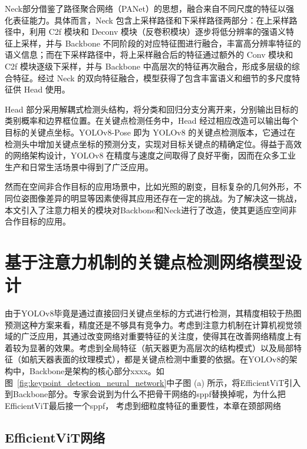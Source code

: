 Neck部分借鉴了路径聚合网络（PANet）的思想，融合来自不同尺度的特征以强化表征能力。具体而言，Neck 包含上采样路径和下采样路径两部分：在上采样路径中，利用 C2f 模块和 Deconv 模块（反卷积模块）逐步将低分辨率的强语义特征上采样，并与 Backbone 不同阶段的对应特征图进行融合，丰富高分辨率特征的语义信息；而在下采样路径中，将上采样融合后的特征通过额外的 Conv 模块和 C2f 模块逐级下采样，并与 Backbone 中高层次的特征再次融合，形成多层级的综合特征。经过 Neck 的双向特征融合，模型获得了包含丰富语义和细节的多尺度特征供 Head 使用。 

Head 部分采用解耦式检测头结构，将分类和回归分支分离开来，分别输出目标的类别概率和边界框位置。在关键点检测任务中，Head 经过相应改造可以输出每个目标的关键点坐标。YOLOv8-Pose 即为 YOLOv8 的关键点检测版本，它通过在检测头中增加关键点坐标的预测分支，实现对目标关键点的精确定位。得益于高效的网络架构设计，YOLOv8 在精度与速度之间取得了良好平衡，因而在众多工业生产和日常生活场景中得到了广泛应用\cite{sohan2024review,s23167190,ani14121791,Dong2024,yuan2024yolov8}。

然而在空间非合作目标的应用场景中，比如光照的剧变，目标复杂的几何外形，不同位姿图像差异的明显等因素使得其应用还存在一定的挑战。为了解决这一挑战，本文引入了注意力相关的模块对Backbone和Neck进行了改造，使其更适应空间非合作目标的应用。


\section{基于注意力机制的关键点检测网络模型设计}
由于YOLOv8毕竟是通过直接回归关键点坐标的方式进行检测，其精度相较于热图预测这种方案来看，精度还是不够具有竞争力。考虑到注意力机制在计算机视觉领域的广泛应用，其通过改变网络对重要特征的关注度，使得其在改善网络精度上有着较为显著的效果。考虑到全局特征（航天器更为高层次的结构模式）以及局部特征（如航天器表面的纹理模式），都是关键点检测中重要的依据。在YOLOv8的架构中，Backbone是架构的核心部分xxxx。如图~\ref{fig:keypoint_detection_neural_network}中子图 (a) 所示，将EfficientViT引入到Backbone部分。{专家会说到为什么不把骨干网络的sppf替换掉呢，为什么把EfficientViT最后接一个sppf}， 考虑到细粒度特征的重要性，本章在颈部网络 
\subsection{EfficientViT网络}

